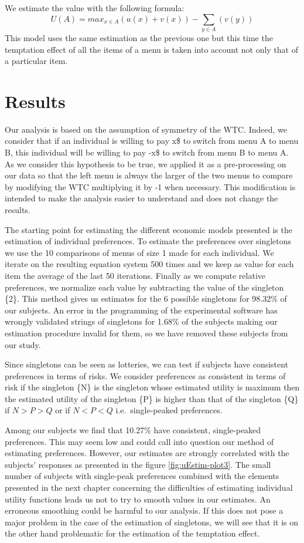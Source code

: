 \documentclass[
]{book}
\begin{document}
We estimate the value with the following formula:
\[ U(A) = max_{x \in A}(u(x) + v(x)) - \sum_{y \in A}(v(y)) \]
This model uses the same estimation as the previous one but this time the
temptation effect of all the items of a menu is taken into account not only that
of a particular item.

\hypertarget{result3}{%
\section{Results}\label{result3}}

Our analysis is based on the assumption of symmetry of the
WTC.
Indeed, we consider that if an individual is willing to pay x\$ to switch from
menu A to menu B, this individual will be willing to pay -x\$ to switch from
menu B to menu A.
As we consider this hypothesis to be true, we applied it as a pre-processing on
our data so that the left menu is always the larger of the two menus to compare
by modifying the WTC multiplying it by -1 when necessary.
This modification is intended to make the analysis easier to understand and does
not change the results.

The starting point for estimating the different economic models presented is the
estimation of individual preferences.
To estimate the preferences over singletons we use the 10 comparisons of menus
of size 1 made for each individual.
We iterate on the resulting equation system 500 times and we keep as value for
each item the average of the last 50 iterations.
Finally as we compute relative preferences, we normalize each value by
subtracting the value of the singleton \{2\}.
This method gives us estimates for the 6 possible singletons for
98.32\% of our subjects.
An error in the programming of the experimental software has wrongly validated
strings of singletons for 1.68\% of the subjects making our
estimation procedure invalid for them, so we have removed these subjects from
our study.

Since singletons can be seen as lotteries, we can test if subjects have
consistent preferences in terms of risks.
We consider preferences as consistent in terms of risk if the singleton \{N\} is
the singleton whose estimated utility is maximum then the estimated utility of
the singleton \{P\} is higher than that of the singleton \{Q\} if \(N > P > Q\) or if
\(N < P < Q\) i.e.~single-peaked preferences.

Among our subjects we find that
10.27\% have consistent,
single-peaked preferences.
This may seem low and could call into question our method of estimating
preferences.
However, our estimates are strongly correlated with the subjects' responses as
presented in the figure \ref{fig:uEstim-plot3}.
The small number of subjects with single-peak preferences combined with the
elements presented in the next chapter concerning the difficulties of estimating
individual utility functions leads us not to try to smooth values in our
estimates.
An erroneous smoothing could be harmful to our analysis.
If this does not pose a major problem in the case of the estimation of
singletons, we will see that it is on the other hand problematic for the
estimation of the temptation effect.
\end{document}
